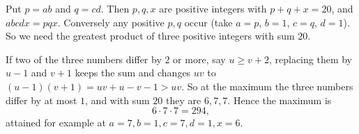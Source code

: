 Put $p=ab$ and $q=cd$. Then $p,q,x$ are positive integers with $p+q+x=20$, and $abcdx=pqx$. Conversely any positive $p,q$ occur (take $a=p$, $b=1$, $c=q$, $d=1$). So we need the greatest product of three positive integers with sum $20$.

If two of the three numbers differ by $2$ or more, say $u\ge v+2$, replacing them by $u-1$ and $v+1$ keeps the sum and changes $uv$ to $(u-1)(v+1)=uv+u-v-1>uv$. So at the maximum the three numbers differ by at most $1$, and with sum $20$ they are $6,7,7$. Hence the maximum is
\[
6\cdot7\cdot7=\boxed{294},
\]
attained for example at $a=7,b=1,c=7,d=1,x=6$.
